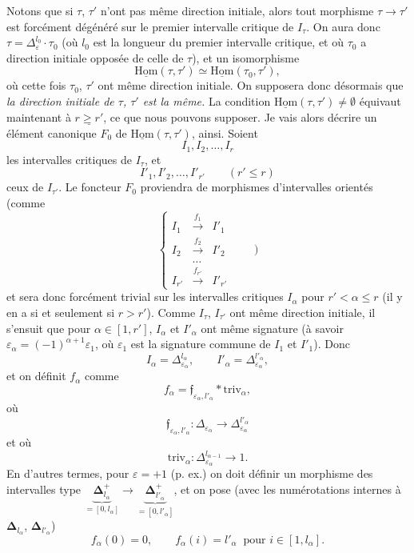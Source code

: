 \documentclass[11pt]{article}
\newcommand{\msp}[1]{\marginpar{\vspace*{10pt}\footnotesize [#1]}}
\newcommand{\uHom}{\underline{\mathrm{Hom}}}
\newcommand{\triv}{\mathrm{triv}}
\begin{document}
Notons que si $\tau$, $\tau'$ n'ont pas même direction initiale, alors tout morphisme $\tau\longrightarrow\tau'$ est forcément dégénéré sur le premier intervalle critique de $I_\tau$. On aura donc $\tau=\Delta_\varepsilon^{l_0}\cdot\tau_0$ (où $l_0$ est la longueur du premier intervalle critique, et où $\tau_0$ a direction initiale opposée de celle de $\tau$), et un isomorphisme
\[
\uHom(\tau,\tau')\simeq\uHom(\tau_0,\tau'),
\]
où cette fois $\tau_0$, $\tau'$ ont même direction initiale. On supposera donc désormais que \textit{la direction initiale de $\tau$, $\tau'$ est la même.} La condition $\uHom(\tau,\tau')\neq\emptyset$ équivaut maintenant à $\underline{r\geq r'}$, ce que nous pouvons supposer. Je vais alors décrire un élément canonique
\msp{page 85}
$F_0$ de $\uHom(\tau,\tau')$, ainsi. Soient
\[
I_1,I_2,\dots,I_r
\]
les intervalles critiques de $I_\tau$, et
\[
I'_1,I'_2,\dots,I'_{r'}\qquad(r'\leq r)
\]
ceux de $I_{\tau'}$. Le foncteur $F_0$ proviendra de morphismes d'intervalles orientés (comme
\[
\left\{
\begin{array}{ccc}
I_1 & \xrightarrow{f_1} & I'_1\\[4pt]
I_2 & \xrightarrow{f_2} & I'_2\\[4pt]
 & \dots & \\[4pt]
I_{r'} & \xrightarrow{f_{r'}} & I'_{r'}
\end{array}
\right.\qquad)
\]
et sera donc forcément trivial sur les intervalles critiques $I_\alpha$ pour $r'<\alpha\leq r$ (il y en a si et seulement si $r>r'$). Comme $I_\tau$, $I_{\tau'}$ ont même direction initiale, il s'ensuit que pour $\alpha\in[1,r']$, $I_\alpha$ et $I'_\alpha$ ont même signature (à savoir $\varepsilon_\alpha=(-1)^{\alpha+1}\varepsilon_1$, où $\varepsilon_1$ est la signature commune de $I_1$ et $I'_1$). Donc
\[
I_\alpha=\Delta^{l_\alpha}_{\varepsilon_\alpha},\qquad I'_\alpha=\Delta^{l'_\alpha}_{\varepsilon_\alpha},
\]
et on définit $f_\alpha$ comme
\[
f_\alpha=\mathfrak{f}_{\varepsilon_\alpha,l'_\alpha}*\triv_\alpha,
\]
où
\[
\mathfrak{f}_{\varepsilon_\alpha,l'_\alpha}:\Delta_{\varepsilon_\alpha}\longrightarrow\Delta^{l'_\alpha}_{\varepsilon_\alpha}
\]
et où
\[
\triv_\alpha:\Delta^{l_{\alpha-1}}_{\varepsilon_\alpha}\longrightarrow1. %
\]
En d'autres termes, pour $\varepsilon=+1$ (p. ex.) on doit définir un morphisme des intervalles type $\underbrace{\mathbf{\Delta}^+_{l_\alpha}}_{=[0,l_\alpha]}\longrightarrow\underbrace{\mathbf{\Delta}^+_{l'_\alpha}}_{=[0,l'_\alpha]}$, et on pose (avec les numérotations internes à $\mathbf{\Delta}_{l_\alpha}$, $\mathbf{\Delta}_{l'_\alpha}$)
\[
f_\alpha(0)=0,\qquad f_\alpha(i)=l'_\alpha\ \text{ pour }i\in[1,l_\alpha].
\]
\end{document}
